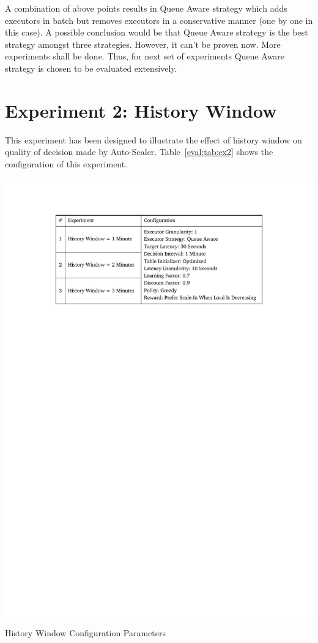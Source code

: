 A combination of above points results in Queue Aware strategy which adds executors in batch but removes executors in a conservative manner (one by one in this case). A possible conclusion would be that Queue Aware strategy is the best strategy amongst three strategies. However, it can't be proven now. More experiments shall be done. Thus, for next set of experiments Queue Aware strategy is chosen to be evaluated extensively.
\clearpage
\section{Experiment 2: History Window}
This experiment has been designed to illustrate the effect of history window on quality of decision made by Auto-Scaler. Table~\ref{eval:tab:ex2} shows the configuration of this experiment.
\begin{table}[h]
    \includegraphics[clip,trim=3.3cm 21.18cm 3.25cm 2.5cm]{tables/ex2.pdf}
    \centering
    \caption{History Window Configuration Parameters}
    \label{eval:tab:ex2}
\end{table}

